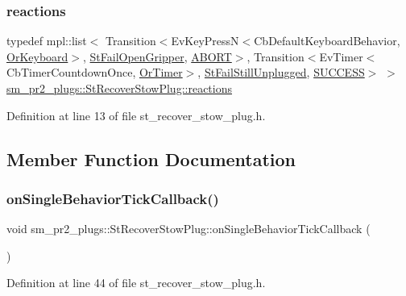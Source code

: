 \subsubsection{\texorpdfstring{reactions}{reactions}}
{\footnotesize\ttfamily typedef mpl\+::list$<$ Transition$<$Ev\+Key\+PressN$<$Cb\+Default\+Keyboard\+Behavior, \hyperlink{classsm__pr2__plugs_1_1OrKeyboard}{Or\+Keyboard}$>$, \hyperlink{structsm__pr2__plugs_1_1StFailOpenGripper}{St\+Fail\+Open\+Gripper}, \hyperlink{classABORT}{A\+B\+O\+RT}$>$, Transition$<$Ev\+Timer$<$Cb\+Timer\+Countdown\+Once, \hyperlink{classsm__pr2__plugs_1_1OrTimer}{Or\+Timer}$>$, \hyperlink{structsm__pr2__plugs_1_1StFailStillUnplugged}{St\+Fail\+Still\+Unplugged}, \hyperlink{classSUCCESS}{S\+U\+C\+C\+E\+SS}$>$ $>$ \hyperlink{structsm__pr2__plugs_1_1StRecoverStowPlug_a44331b5028d908b5a20054cc2ddb1972}{sm\+\_\+pr2\+\_\+plugs\+::\+St\+Recover\+Stow\+Plug\+::reactions}}



Definition at line 13 of file st\+\_\+recover\+\_\+stow\+\_\+plug.\+h.



\subsection{Member Function Documentation}
\mbox{\label{structsm__pr2__plugs_1_1StRecoverStowPlug_af118f0e9ead8955ef7152fb8f55474ab}} 
\subsubsection{\texorpdfstring{on\+Single\+Behavior\+Tick\+Callback()}{onSingleBehaviorTickCallback()}}
{\footnotesize\ttfamily void sm\+\_\+pr2\+\_\+plugs\+::\+St\+Recover\+Stow\+Plug\+::on\+Single\+Behavior\+Tick\+Callback (\begin{DoxyParamCaption}{ }\end{DoxyParamCaption})\hspace{0.3cm}{\ttfamily [inline]}}



Definition at line 44 of file st\+\_\+recover\+\_\+stow\+\_\+plug.\+h.



